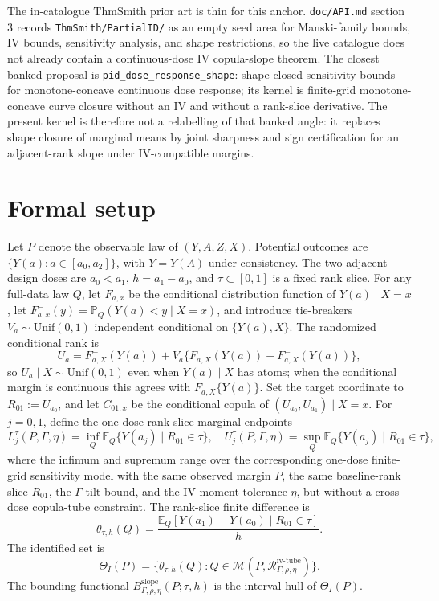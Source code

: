 \documentclass[11pt]{article}
\newcommand{\E}{\mathbb{E}}
\renewcommand{\Pr}{\mathbb{P}}
\theoremstyle{definition}
\theoremstyle{plain}
\theoremstyle{remark}
\begin{document}
The in-catalogue ThmSmith prior art is thin for this anchor.  \texttt{doc/API.md} section 3 records \texttt{ThmSmith/PartialID/} as an empty seed area for Manski-family bounds, IV bounds, sensitivity analysis, and shape restrictions, so the live catalogue does not already contain a continuous-dose IV copula-slope theorem.  The closest banked proposal is \texttt{pid\_dose\_response\_shape}: shape-closed sensitivity bounds for monotone-concave continuous dose response; its kernel is finite-grid monotone-concave curve closure without an IV and without a rank-slice derivative.  The present kernel is therefore not a relabelling of that banked angle: it replaces shape closure of marginal means by joint sharpness and sign certification for an adjacent-rank slope under IV-compatible margins.

\section{Formal setup}
Let \(P\) denote the observable law of \((Y,A,Z,X)\).  Potential outcomes are \(\{Y(a):a\in[a_0,a_2]\}\), with \(Y=Y(A)\) under consistency.  The two adjacent design doses are \(a_0<a_1\), \(h=a_1-a_0\), and \(\tau\subset[0,1]\) is a fixed rank slice.  For any full-data law \(Q\), let \(F_{a,x}\) be the conditional distribution function of \(Y(a)\mid X=x\), let \(F^-_{a,x}(y)=\Pr_Q(Y(a)<y\mid X=x)\), and introduce tie-breakers \(V_a\sim\mathrm{Unif}(0,1)\) independent conditional on \(\{Y(a),X\}\).  The randomized conditional rank is
\[
U_a=F^-_{a,X}(Y(a))+V_a\{F_{a,X}(Y(a))-F^-_{a,X}(Y(a))\},
\]
so \(U_a\mid X\sim\mathrm{Unif}(0,1)\) even when \(Y(a)\mid X\) has atoms; when the conditional margin is continuous this agrees with \(F_{a,X}\{Y(a)\}\).  Set the target coordinate to \(R_{01}:=U_{a_0}\), and let \(C_{01,x}\) be the conditional copula of \((U_{a_0},U_{a_1})\mid X=x\).  For \(j=0,1\), define the one-dose rank-slice marginal endpoints
\[
L_j^\tau(P,\Gamma,\eta)=\inf_Q \E_Q\{Y(a_j)\mid R_{01}\in\tau\},\quad
U_j^\tau(P,\Gamma,\eta)=\sup_Q \E_Q\{Y(a_j)\mid R_{01}\in\tau\},
\]
where the infimum and supremum range over the corresponding one-dose finite-grid sensitivity model with the same observed margin \(P\), the same baseline-rank slice \(R_{01}\), the \(\Gamma\)-tilt bound, and the IV moment tolerance \(\eta\), but without a cross-dose copula-tube constraint.  The rank-slice finite difference is
\[
\theta_{\tau,h}(Q)=
\frac{\E_Q[Y(a_1)-Y(a_0)\mid R_{01}\in\tau]}{h}.
\]
The identified set is
\[
\Theta_I(P)=\{\theta_{\tau,h}(Q): Q\in\mathcal M(P,\mathcal R_{\Gamma,\rho,\eta}^{\mathrm{iv\text{-}tube}})\}.
\]
The bounding functional \(B_{\Gamma,\rho,\eta}^{\mathrm{slope}}(P;\tau,h)\) is the interval hull of \(\Theta_I(P)\).
\end{document}
